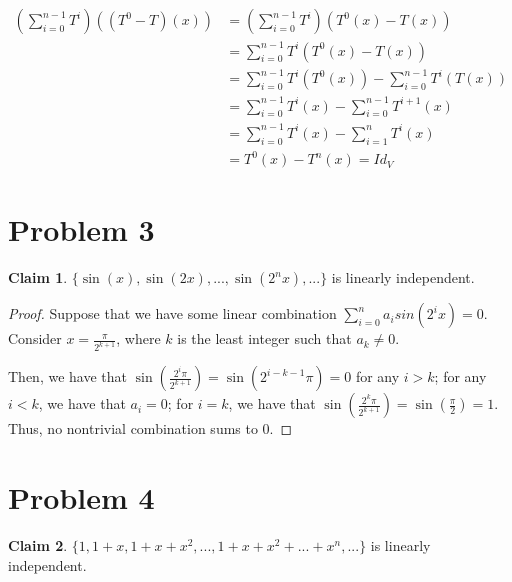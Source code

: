 \documentclass[12pt,letterpaper]{article}
\theoremstyle{definition}
\newtheorem*{claim}{Claim}
\begin{document}
\begin{align*}
  (\sum_{i=0}^{n-1}T^i)((T^0-T)(x)) &= (\sum_{i=0}^{n-1}T^i)(T^0(x)-T(x)) \\
                                    &= \sum_{i=0}^{n-1}T^i(T^0(x) - T(x)) \\
                                    &= \sum_{i=0}^{n-1}T^i(T^0(x)) - \sum_{i=0}^{n-1}T^i(T(x)) \\
                                    &= \sum_{i=0}^{n-1}T^i(x) - \sum_{i=0}^{n-1}T^{i + 1}(x) \\
                                    &= \sum_{i=0}^{n-1}T^i(x) - \sum_{i=1}^{n}T^i(x) \\
                                    &= T^0(x) - T^n(x) = Id_V
\end{align*}


\section*{Problem 3}

\begin{claim}
  $\{\sin(x), \sin(2x),..., \sin(2^nx),...\}$ is linearly independent.
\end{claim}

\begin{proof}
  Suppose that we have some linear combination $\sum_{i=0}^na_isin(2^ix) = 0$.
  Consider $x = \frac{\pi}{2^{k+1}}$, where $k$ is the least integer such that
  $a_k \neq 0$.

  Then, we have that $\sin(\frac{2^i\pi}{2^{k+1}}) = \sin(2^{i - k - 1}\pi) = 0$ for
  any $i > k$; for any $i < k$, we have that $a_i = 0$; for $i = k$, we have
  that $\sin(\frac{2^k\pi}{2^{k+1}}) = \sin(\frac{\pi}{2}) = 1$. Thus, no
  nontrivial combination sums to 0.
\end{proof}

\section*{Problem 4}

\begin{claim}
  $\{1, 1 + x, 1 + x + x^2, ..., 1 + x + x^2 + ... + x^n, ...\}$ is linearly independent.
\end{claim}
\end{document}
